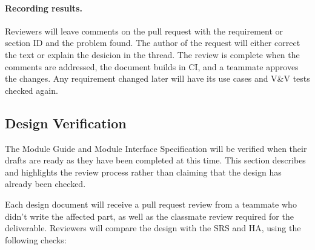 \documentclass[12pt, titlepage]{article}
\begin{document}
\paragraph{Recording results.} Reviewers will leave comments on the pull request with the requirement or section ID and the problem found. The author of the request will either correct the text or explain the desicion in the thread. The review is complete when the comments are addressed, the document builds in CI, and a teammate approves the changes. Any requirement changed later will have its use cases and V\&V tests checked again.
\subsection{Design Verification}

The Module Guide and Module Interface Specification will be verified when their drafts are ready as they have been completed at this time. This section describes and highlights the review process rather than claiming that the design has already been checked.



Each design document will receive a pull request review from a teammate who didn't write the affected part, as well as the classmate review required for the deliverable. Reviewers will compare the design with the SRS and HA, using the following checks:
\end{document}
